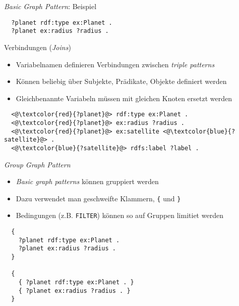 \documentclass{beamer}
\begin{document}
\begin{frame}[fragile]{\emph{Basic Graph Pattern}: Beispiel}
    
    \Large
	\begin{lstlisting}		
  ?planet rdf:type ex:Planet .
  ?planet ex:radius ?radius .
	\end{lstlisting}
	
\end{frame}

\begin{frame}[fragile]{Verbindungen (\emph{Joins})}
	
	\begin{itemize}
		\item Variabelnamen definieren Verbindungen zwischen \emph{triple patterns}
		\item Können beliebig über Subjekte, Prädikate, Objekte definiert werden
		\item Gleichbenannte Variabeln müssen mit gleichen Knoten ersetzt werden
	\end{itemize}
	
	\vspace{0.5cm}
	\large
	\begin{lstlisting}		
  <@\textcolor{red}{?planet}@> rdf:type ex:Planet .
  <@\textcolor{red}{?planet}@> ex:radius ?radius .
  <@\textcolor{red}{?planet}@> ex:satellite <@\textcolor{blue}{?satellite}@> .
  <@\textcolor{blue}{?satellite}@> rdfs:label ?label .
    \end{lstlisting}
	
\end{frame}

\begin{frame}[fragile]{\emph{Group Graph Pattern}}
	
	\begin{itemize}
		\item \emph{Basic graph patterns} können gruppiert werden
		\item Dazu verwendet man geschweifte Klammern, \texttt{\{} und \texttt{\}}
		\item Bedingungen (z.B. \texttt{FILTER}) können so auf Gruppen limitiet werden
	\end{itemize}
	
	\begin{lstlisting}
  {
    ?planet rdf:type ex:Planet .
    ?planet ex:radius ?radius .
  }

  {
    { ?planet rdf:type ex:Planet . }
    { ?planet ex:radius ?radius . }
  }
	\end{lstlisting}
	    
\end{frame}
\end{document}
